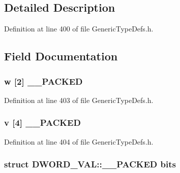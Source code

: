 \subsection{Detailed Description}


Definition at line 400 of file Generic\+Type\+Defs.\+h.



\subsection{Field Documentation}
\hypertarget{union_d_w_o_r_d___v_a_l_afe4adbb94ca3dcff16d01c708e733676}{}
\subsubsection[{\+\_\+\+\_\+\+P\+A\+C\+K\+E\+D}]{ w \mbox{[}2\mbox{]} {\bf \+\_\+\+\_\+\+P\+A\+C\+K\+E\+D}}\label{union_d_w_o_r_d___v_a_l_afe4adbb94ca3dcff16d01c708e733676}


Definition at line 403 of file Generic\+Type\+Defs.\+h.

\hypertarget{union_d_w_o_r_d___v_a_l_a70952bfab8399a96313563a13e17ed80}{}
\subsubsection[{\+\_\+\+\_\+\+P\+A\+C\+K\+E\+D}]{ {\bf v} \mbox{[}4\mbox{]} {\bf \+\_\+\+\_\+\+P\+A\+C\+K\+E\+D}}\label{union_d_w_o_r_d___v_a_l_a70952bfab8399a96313563a13e17ed80}


Definition at line 404 of file Generic\+Type\+Defs.\+h.

\hypertarget{union_d_w_o_r_d___v_a_l_a8945fb9e4b638e5e5211393ef79d5581}{}
\subsubsection[{bits}]{\setlength{\rightskip}{0pt plus 5cm}struct {\bf D\+W\+O\+R\+D\+\_\+\+V\+A\+L\+::\+\_\+\+\_\+\+P\+A\+C\+K\+E\+D}  bits}\label{union_d_w_o_r_d___v_a_l_a8945fb9e4b638e5e5211393ef79d5581}
\hypertarget{union_d_w_o_r_d___v_a_l_a4790ca552a89e97441bece3078aa8785}{}

